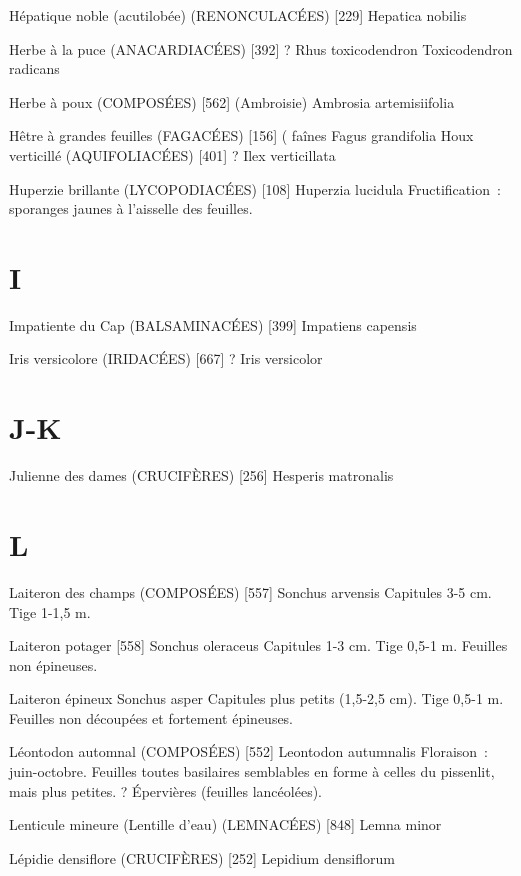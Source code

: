 Hépatique noble (acutilobée) (RENONCULACÉES)  [229]
				Hepatica nobilis

Herbe à la puce (ANACARDIACÉES)  [392]			?
				Rhus toxicodendron
				Toxicodendron radicans

Herbe à poux (COMPOSÉES)  [562]  (Ambroisie)
				Ambrosia artemisiifolia

Hêtre à grandes feuilles (FAGACÉES)  [156]			( faînes
				Fagus grandifolia
Houx verticillé (AQUIFOLIACÉES)  [401]			?
				Ilex verticillata

Huperzie brillante (LYCOPODIACÉES)  [108]
				Huperzia lucidula
Fructification : sporanges jaunes à l’aisselle des feuilles.

\chapter*{I}

Impatiente du Cap (BALSAMINACÉES)  [399]
				Impatiens capensis

Iris versicolore (IRIDACÉES)  [667]				?
				Iris versicolor

\chapter*{J-K}

Julienne des dames (CRUCIFÈRES)  [256]
				Hesperis matronalis




\chapter*{L}

Laiteron des champs (COMPOSÉES)  [557]
				Sonchus arvensis
Capitules 3-5 cm. Tige 1-1,5 m.

Laiteron potager  [558]
				Sonchus oleraceus
Capitules 1-3 cm. Tige 0,5-1 m. Feuilles non épineuses.

Laiteron épineux
				Sonchus asper
Capitules plus petits (1,5-2,5 cm). Tige 0,5-1 m. Feuilles non découpées et fortement épineuses.

Léontodon automnal (COMPOSÉES)  [552]
				Leontodon autumnalis
Floraison : juin-octobre. Feuilles toutes basilaires semblables en forme à celles du pissenlit, mais plus petites. ? Épervières (feuilles lancéolées).

Lenticule mineure (Lentille d’eau) (LEMNACÉES)  [848]
				Lemna minor


Lépidie densiflore (CRUCIFÈRES)  [252]
				Lepidium densiflorum

